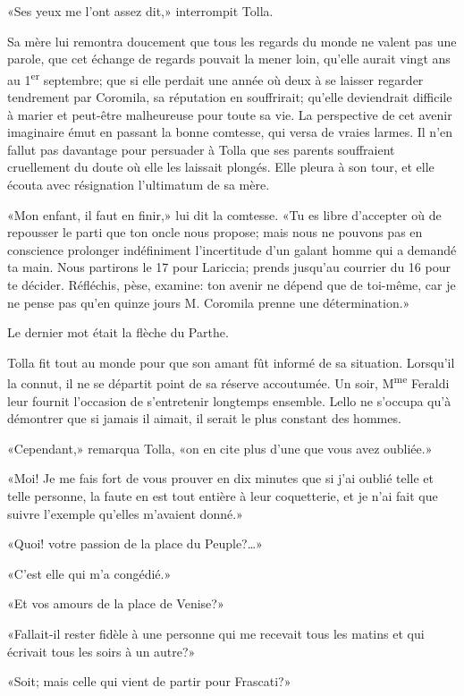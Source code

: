 «Ses yeux me l'ont assez dit,» interrompit Tolla.

Sa mère lui remontra doucement que tous les regards du monde ne valent
pas une parole, que cet échange de regards pouvait la mener loin,
qu'elle aurait vingt ans au 1\textsuperscript{er} septembre; que si elle
perdait une année où deux à se laisser regarder tendrement par Coromila,
sa réputation en souffrirait; qu'elle deviendrait difficile à marier et
peut-être malheureuse pour toute sa vie. La perspective de cet avenir
imaginaire émut en passant la bonne comtesse, qui versa de vraies
larmes. Il n'en fallut pas davantage pour persuader à Tolla que ses
parents souffraient cruellement du doute où elle les laissait plongés.
Elle pleura à son tour, et elle écouta avec résignation l'ultimatum de
sa mère.

«Mon enfant, il faut en finir,» lui dit la comtesse. «Tu es libre
d'accepter où de repousser le parti que ton oncle nous propose; mais
nous ne pouvons pas en conscience prolonger indéfiniment l'incertitude
d'un galant homme qui a demandé ta main. Nous partirons le 17 pour
Lariccia; prends jusqu'au courrier du 16 pour te décider. Réfléchis,
pèse, examine: ton avenir ne dépend que de toi-même, car je ne pense pas
qu'en quinze jours M. Coromila prenne une détermination.»

Le dernier mot était la flèche du Parthe.

Tolla fit tout au monde pour que son amant fût informé de sa situation.
Lorsqu'il la connut, il ne se départit point de sa réserve accoutumée.
Un soir, M\textsuperscript{me} Feraldi leur fournit l'occasion de
s'entretenir longtemps ensemble. Lello ne s'occupa qu'à démontrer que si
jamais il aimait, il serait le plus constant des hommes.

«Cependant,» remarqua Tolla, «on en cite plus d'une que vous avez
oubliée.»

«Moi! Je me fais fort de vous prouver en dix minutes que si j'ai oublié
telle et telle personne, la faute en est tout entière à leur
coquetterie, et je n'ai fait que suivre l'exemple qu'elles m'avaient
donné.»

«Quoi! votre passion de la place du Peuple?\ldots»

«C'est elle qui m'a congédié.»

«Et vos amours de la place de Venise?»

«Fallait-il rester fidèle à une personne qui me recevait tous les matins
et qui écrivait tous les soirs à un autre?»

«Soit; mais celle qui vient de partir pour Frascati?»

